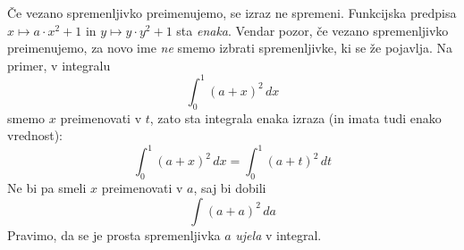 Če vezano spremenljivko preimenujemo, se izraz ne spremeni. Funkcijska predpisa $x \mapsto a \cdot x^2 + 1$ in $y \mapsto y \cdot y^2 + 1$ sta \emph{enaka}. Vendar pozor, če vezano spremenljivko preimenujemo, za novo ime \emph{ne} smemo izbrati spremenljivke, ki se že pojavlja. Na primer, v integralu
%
\begin{equation*}
  \int_0^1 (a + x)^2 \, d x
\end{equation*}
%
smemo $x$ preimenovati v $t$, zato sta integrala enaka izraza (in imata tudi enako vrednost):
%
\begin{equation*}
  \int_0^1 (a + x)^2 \, d x  = \int_0^1 (a + t)^2 \, d t
\end{equation*}
%
Ne bi pa smeli $x$ preimenovati v $a$, saj bi dobili
%
\begin{equation*}
  \int (a + a)^2 \, d a
\end{equation*}
%
Pravimo, da se je prosta spremenljivka $a$ \emph{ujela} v integral.


